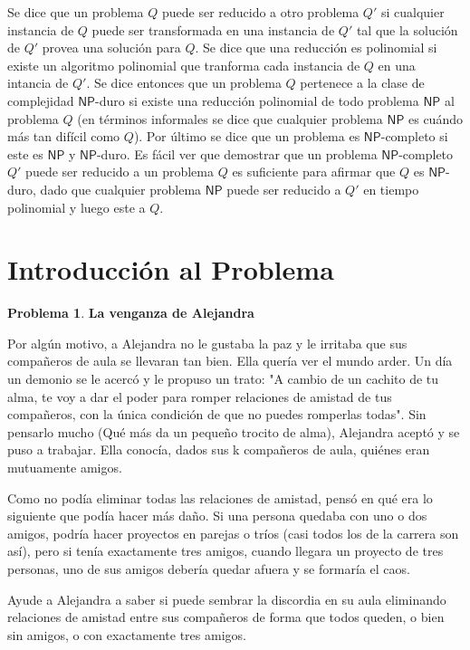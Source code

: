 \documentclass[10pt]{amsart}
\theoremstyle{definition}
\newtheorem{prob}[theorem]{Problema}
\numberwithin{equation}{section}
\begin{document}
Se dice que un problema $Q$ puede ser reducido a otro problema $Q'$ si cualquier instancia de $Q$ puede ser transformada en una instancia de $Q'$ tal que la soluci\'on de $Q'$ provea una soluci\'on para $Q$. Se dice que una reducci\'on  es polinomial si existe un algoritmo polinomial que tranforma cada instancia de $Q$ en una intancia de $Q'$. Se dice entonces que un problema $Q$ pertenece a la clase de complejidad $\mathsf{NP}$-duro si existe una reducci\'on polinomial de todo problema $\mathsf{NP}$ al problema $Q$ (en t\'erminos informales se dice que cualquier problema $\mathsf{NP}$ es cu\'ando m\'as tan dif\'icil como $Q$). Por \'ultimo se dice que un problema es $\mathsf{NP}$-completo si este es $\mathsf{NP}$ y $\mathsf{NP}$-duro. Es f\'acil ver que demostrar que un problema $\mathsf{NP}$-completo $Q'$ puede ser reducido a un problema  $Q$ es  suficiente para afirmar que $Q$ es $\mathsf{NP}$-duro, dado que cualquier problema $\mathsf{NP}$ puede ser reducido a $Q'$ en tiempo polinomial y luego este a $Q$.


\section{Introducción al Problema}
	\begin{prob} 
		\textbf{La venganza de Alejandra}
		
		Por algún motivo, a Alejandra no le gustaba la paz y le irritaba que sus compañeros de aula se llevaran tan bien. Ella quería ver el mundo arder. Un día un demonio se le acercó y le propuso un trato: "A cambio de un cachito de tu alma, te voy a dar el poder para romper relaciones de amistad de tus compañeros, con la única condición de que no puedes romperlas todas". Sin pensarlo mucho (Qué más da un pequeño trocito de alma), Alejandra aceptó y se puso a trabajar. Ella conocía, dados sus k compañeros de aula, quiénes eran mutuamente amigos.
		
		Como no podía eliminar todas las relaciones de amistad, pensó en qué era lo siguiente que podía hacer más daño. Si una persona quedaba con uno o dos amigos, podría hacer proyectos en parejas o tríos (casi todos los de la carrera son así), pero si tenía exactamente tres amigos, cuando llegara un proyecto de tres personas, uno de sus amigos debería quedar afuera y se formaría el caos.
		
		Ayude a Alejandra a saber si puede sembrar la discordia en su aula eliminando relaciones de amistad entre sus compañeros de forma que todos queden, o bien sin amigos, o con exactamente tres amigos.
	\end{prob}	
\end{document}
